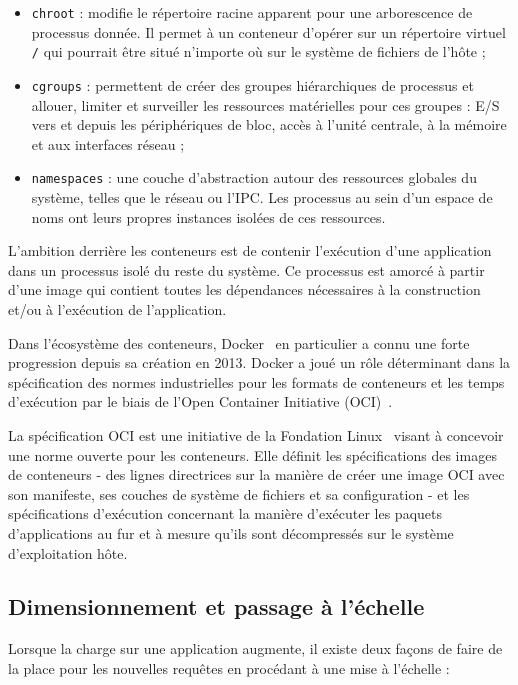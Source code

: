 \begin{itemize}
    \item \texttt{chroot} : modifie le répertoire racine apparent pour une arborescence de processus donnée. Il permet à un conteneur d'opérer sur un répertoire virtuel \texttt{/} qui pourrait être situé n'importe où sur le système de fichiers de l'hôte ;
    \item \texttt{cgroups} : permettent de créer des groupes hiérarchiques de processus et allouer, limiter et surveiller les ressources matérielles pour ces groupes : E/S vers et depuis les périphériques de bloc, accès à l'unité centrale, à la mémoire et aux interfaces réseau ;
    \item \texttt{namespaces} : une couche d'abstraction autour des ressources globales du système, telles que le réseau ou l'IPC. Les processus au sein d'un espace de noms ont leurs propres instances isolées de ces ressources.
\end{itemize}

L'ambition derrière les conteneurs est de contenir l'exécution d'une application dans un processus isolé du reste du système. Ce processus est amorcé à partir d'une image qui contient toutes les dépendances nécessaires à la construction et/ou à l'exécution de l'application.

Dans l'écosystème des conteneurs, Docker~\cite{docker} en particulier a connu une forte progression depuis sa création en 2013. Docker a joué un rôle déterminant dans la spécification des normes industrielles pour les formats de conteneurs et les temps d'exécution par le biais de l'Open Container Initiative (OCI)~\cite{oci}.

La spécification OCI est une initiative de la Fondation Linux~\cite{linuxfoundation} visant à concevoir une norme ouverte pour les conteneurs. Elle définit les spécifications des images de conteneurs - des lignes directrices sur la manière de créer une image OCI avec son manifeste, ses couches de système de fichiers et sa configuration - et les spécifications d'exécution concernant la manière d'exécuter les paquets d'applications au fur et à mesure qu'ils sont décompressés sur le système d'exploitation hôte.

\subsection{Dimensionnement et passage à l'échelle}

Lorsque la charge sur une application augmente, il existe deux façons de faire de la place pour les nouvelles requêtes en procédant à une mise à l'échelle :

